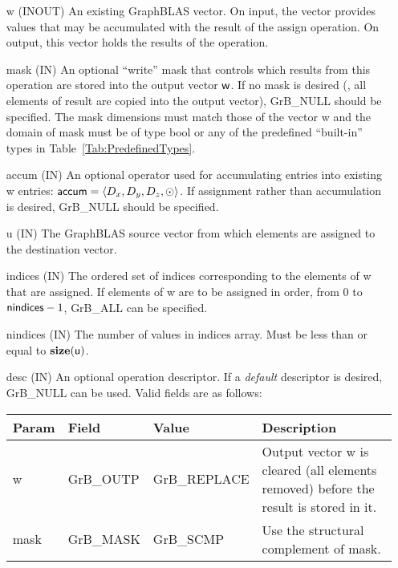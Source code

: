 \begin{itemize}[leftmargin=1in]
    \item[{\sf w}]    ({\sf INOUT}) An existing GraphBLAS vector.  On input,
    the vector provides values that may be accumulated with the result of the
    assign operation.  On output, this vector holds the results of the
    operation.

    \item[{\sf mask}]  ({\sf IN}) An optional ``write'' mask that controls which
    results from this operation are stored into the output vector
    ${\sf w}$.  If no mask is desired (\ie, all elements
    of result are copied into the output vector), {\sf GrB\_NULL}
    should be specified. The mask dimensions must match those of the
    vector {\sf w} and the domain of {\sf mask} must be
    of type {\sf bool} or any of the predefined ``built-in'' types in
    Table~\ref{Tab:PredefinedTypes}.


    \item[{\sf accum}]    ({\sf IN}) An optional operator used for accumulating
    entries into existing {\sf w} entries: ${\sf accum} = \langle D_x,
    D_y, D_z,\odot \rangle$. If assignment rather than accumulation is
    desired, {\sf GrB\_NULL} should be specified.

    \item[{\sf u}]       ({\sf IN}) The GraphBLAS source vector from which elements are assigned to the destination vector.
    
    \item[{\sf indices}]  ({\sf IN}) The ordered set of indices corresponding to the 
    elements of {\sf w} that are assigned.  If elements of
    {\sf w} are to be assigned in order, from $0$ to ${\sf nindices} - 1$, {\sf GrB\_ALL} can be specified.
    
    \item[{\sf nindices}] ({\sf IN}) The number of values in {\sf indices} array.
    Must be less than or equal to $\bold{size}({\sf u})$.

    \item[{\sf desc}]     ({\sf IN}) An optional operation descriptor.  If a 
    \emph{default} descriptor is desired, {\sf GrB\_NULL} can be used.  Valid 
    fields are as follows: \\
    
    \begin{tabular}{lllp{2.5in}}
        Param & Field  & Value & Description \\
        \hline
        {\sf w}    & {\sf GrB\_OUTP} & {\sf GrB\_REPLACE} & Output vector {\sf w}
        is cleared (all elements removed) before the result is stored in it. \\
        
        {\sf mask} & {\sf GrB\_MASK} & {\sf GrB\_SCMP}   & Use the structural 
        complement of {\sf mask}. \\
    \end{tabular}
\end{itemize}

